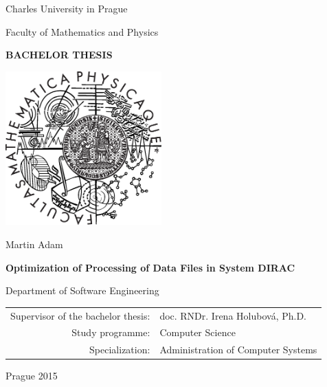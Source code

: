 \documentclass[12pt,a4paper]{report}
\begin{document}


\pagestyle{empty}
\begin{center}

\large

Charles University in Prague

\medskip

Faculty of Mathematics and Physics

\vfill

{\bf\Large BACHELOR THESIS}

\vfill

\centerline{\mbox{\includegraphics[width=60mm]{logo.eps}}}

\vfill
\vspace{5mm}

{\LARGE Martin Adam}

\vspace{15mm}

{\LARGE\bfseries Optimization of Processing of Data Files in System DIRAC}

\vfill

Department of Software Engineering

\vfill

\begin{tabular}{rl}

Supervisor of the bachelor thesis: & doc. RNDr. Irena Holubová, Ph.D. \\
\noalign{\vspace{2mm}}
Study programme: & Computer Science \\
\noalign{\vspace{2mm}}
Specialization: &  Administration of Computer Systems \\
\end{tabular}

\vfill

Prague 2015

\end{center}
\end{document}
